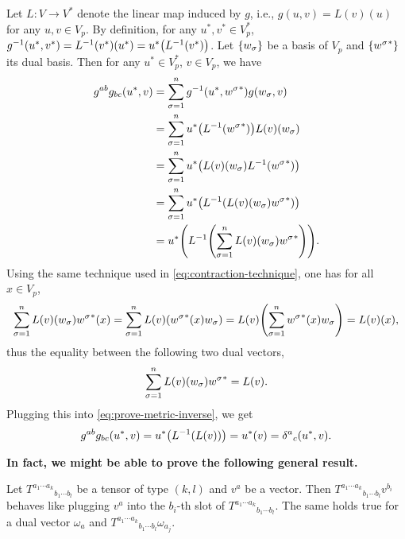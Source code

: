 \documentclass{note}
\numberwithin{equation}{chapter}
\begin{document}
Let $L\colon V\to V^*$ denote the linear map induced by $g$, i.e., $g(u, v) =
    L(v)(u)$ for any $u, v \in V_p$. By definition, for any $u^*, v^* \in V_p^*$,
$g^{-1}(u^*, v^*) = L^{-1}(v^*)(u^*) = u^*\prn{L^{-1}(v^*)}$. Let
$\set{w_\sigma}$ be a basis of $V_p$ and $\set{{w^\sigma}^*}$ its dual basis.
Then for any $u^* \in V_p^*$, $v \in V_p$, we have
\begin{align}
    g^{ab}g_{bc}(u^*, v)
     & = \sum_{\sigma=1}^n g^{-1}\prn{u^*, {w^\sigma}^*} g\prn{w_\sigma, v} \notag     \\
     & = \sum_{\sigma=1}^n u^*\prn{L^{-1}\prn{{w^\sigma}^*}} L(v)\prn{w_\sigma} \notag \\
     & = \sum_{\sigma=1}^n u^*\prn{L(v)\prn{w_\sigma}L^{-1}\prn{{w^\sigma}^*}} \notag  \\
     & = \sum_{\sigma=1}^n u^*\prn{L^{-1}\prn{L(v)\prn{w_\sigma}{w^\sigma}^*}} \notag  \\
     & = u^*\prn{L^{-1}\prn{\sum_{\sigma=1}^n L(v)\prn{w_\sigma}{w^\sigma}^*}}.
    \label{eq:prove-metric-inverse}
\end{align}
Using the same technique used in \eqref{eq:contraction-technique}, one has for
all $x \in V_p$,
\begin{equation*}
    \sum_{\sigma=1}^n L(v)\prn{w_\sigma}{w^\sigma}^*(x) = \sum_{\sigma=1}^n
    L(v)\prn{{w^\sigma}^*(x) w_\sigma} = L(v)\prn{\sum_{\sigma=1}^n {w^\sigma}^*(x)
    w_\sigma} = L(v)(x),
\end{equation*}
thus the equality between the following two dual vectors,
\begin{equation*}
    \sum_{\sigma=1}^n L(v)\prn{w_\sigma}{w^\sigma}^* = L(v).
\end{equation*}
Plugging this into \eqref{eq:prove-metric-inverse}, we get
\begin{equation*}
    g^{ab}g_{bc}(u^*, v) = u^*\prn{L^{-1}(L(v))} = u^*(v) =
    {\delta^a}_c\prn{u^*,v}.
\end{equation*}

{\bfseries In fact, we might be able to prove the following general result.}
\begin{lemma*}
    Let ${T^{a_1\cdots a_k}}_{b_1\cdots b_l}$ be a tensor of type $(k,l)$ and $v^a$
    be a vector. Then ${T^{a_1\cdots a_k}}_{b_1\cdots b_l}v^{b_i}$ behaves like
    plugging $v^a$ into the $b_i$-th slot of ${T^{a_1\cdots a_k}}_{b_1\cdots b_l}$.
    The same holds true for a dual vector $\omega_a$ and ${T^{a_1\cdots
                        a_k}}_{b_1\cdots b_l}\omega_{a_j}$.
\end{lemma*}
\end{document}
